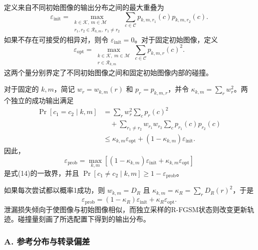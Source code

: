 定义来自不同初始图像的输出分布之间的最大重叠为
\begin{equation}
\varepsilon_{\mathrm{init}} = \max_{\substack{k \in \mathcal{K}, \ m \in \mathcal{M} \\ r_1, r_2 \in \mathcal{R}_{k,m}, \ r_1 \neq r_2}} \sum_{c \in \mathcal{C}} p_{k,m,r_1}(c) p_{k,m,r_2}(c). \tag{31}
\end{equation}
如果不存在可接受的相异对，则令 \(\varepsilon_{\mathrm{init}} = 0\)。对于固定初始图像，定义
\begin{equation}
\varepsilon_{\mathrm{opt}} = \max_{\substack{k \in \mathcal{K}, \ m \in \mathcal{M} \\ r \in \mathcal{R}_{k,m}}} \sum_{c \in \mathcal{C}} p_{k,m,r}(c)^2. \tag{32}
\end{equation}
这两个量分别界定了不同初始图像之间和固定初始图像内部的碰撞。

对于固定的 \(k, m\)，简记 \(w_r = w_{k,m}(r)\) 和 \(p_r = p_{k,m,r}\)，并令 \(\kappa_{k,m} = \sum_r w_r^2\)。两个独立的成功输出满足
\begin{equation}
\begin{aligned}
\Pr[c_1 = c_2 \mid k, m] &= \sum_r w_r^2 \sum_c p_r(c)^2 \\
&\quad + \sum_{r_1 \neq r_2} w_{r_1} w_{r_2} \sum_c p_{r_1}(c) p_{r_2}(c) \\
&\le \kappa_{k,m} \varepsilon_{\mathrm{opt}} + (1 - \kappa_{k,m}) \varepsilon_{\mathrm{init}}.
\end{aligned} \tag{33}
\end{equation}
因此，
\begin{equation}
\varepsilon_{\mathrm{prob}} = \max_{k,m} \left[ (1 - \kappa_{k,m}) \varepsilon_{\mathrm{init}} + \kappa_{k,m} \varepsilon_{\mathrm{opt}} \right] \tag{34}
\end{equation}
是式(14)的一致界，并且 \(\Pr[c_1 \neq c_2 \mid k, m] \ge 1 - \varepsilon_{\mathrm{prob}}\)。

如果每次尝试都以概率1成功，则 \(w_{k,m} = D_R\) 且 \(\kappa_{k,m} = \kappa_R = \sum_r D_R(r)^2\)，于是
\begin{equation}
\varepsilon_{\mathrm{prob}} = (1 - \kappa_R) \varepsilon_{\mathrm{init}} + \kappa_R \varepsilon_{\mathrm{opt}}. \tag{35}
\end{equation}
泄漏损失倾向于使图像与初始图像相似，而独立采样的R-FGSM状态则改变更新轨迹。碰撞量刻画了所选配置下得到的输出分布。

\subsubsection*{A. 参考分布与转录偏差}

